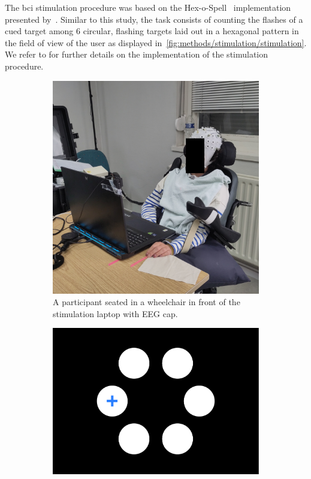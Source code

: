 \documentclass[twocolumn]{article}
\begin{document}
The \ac{bci} stimulation procedure was based on the
Hex-o-Spell~\cite{Treder2010} implementation presented
by~\textcite{VanDenKerchove2024}.
Similar to this study, the task consists of counting the flashes of a cued
target among 6 circular, flashing targets laid out in a hexagonal pattern in the
field of view of the user as displayed
in~\cref{fig:methods/stimulation/stimulation}.
We refer to \textcite{VanDenKerchove2024} for further details on the implementation
of the stimulation procedure.
\begin{figure}
	\centering
	\begin{subfigure}[b]{.41\textwidth}
		\includegraphics[width=\textwidth]{figures/PD01b-obfuscated.jpg}
		\caption{A participant seated in a wheelchair in front of the stimulation laptop with EEG
			cap.}
	\end{subfigure}\hfill%
	\begin{minipage}[b]{.54\textwidth}
		\begin{subfigure}[b]{.45\linewidth}
			\includegraphics[width=\textwidth]{figures/stim_overt.pdf}

\end{subfigure}
\end{minipage}
\end{figure}
\end{document}
